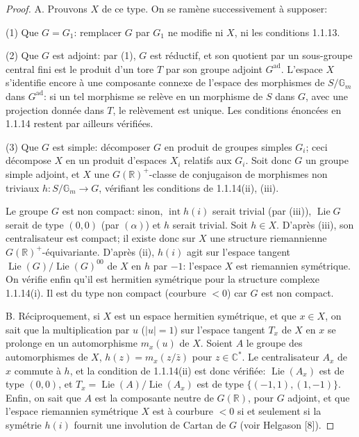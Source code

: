 \documentclass[12pt,a4paper]{article}
\theoremstyle{plain}
\theoremstyle{definition}
\theoremstyle{remark}
\DeclareMathOperator{\Lie}{Lie}
\DeclareMathOperator{\Int}{int}
\newcommand{\RR}{\mathbb{R}}
\newcommand{\CC}{\mathbb{C}}
\newcommand{\Gm}{\mathbb{G}}
\begin{document}
\begin{proof}
A. Prouvons $X$ de ce type. On se ram\`ene successivement \`a supposer:

(1) Que $G = G_1$: remplacer $G$ par $G_1$ ne modifie ni $X$, ni les conditions 1.1.13.

(2) Que $G$ est adjoint: par (1), $G$ est r\'eductif, et son quotient par un sous-groupe central fini est le produit d'un tore $T$ par son groupe adjoint $G^{\text{ad}}$. L'espace $X$ s'identifie encore \`a une composante connexe de l'espace des morphismes de $S/\Gm_m$ dans $G^{\text{ad}}$: si un tel morphisme se rel\`eve en un morphisme de $S$ dans $G$, avec une projection donn\'ee dans $T$, le rel\`evement est unique. Les conditions \'enonc\'ees en 1.1.14 restent par ailleurs v\'erifi\'ees.

(3) Que $G$ est simple: d\'ecomposer $G$ en produit de groupes simples $G_i$; ceci d\'ecompose $X$ en un produit d'espaces $X_i$ relatifs aux $G_i$. Soit donc $G$ un groupe simple adjoint, et $X$ une $G(\RR)^+$-classe de conjugaison de morphismes non triviaux $h:S/\Gm_m \to G$, v\'erifiant les conditions de 1.1.14(ii), (iii).

Le groupe $G$ est non compact: sinon, $\Int h(i)$ serait trivial (par (iii)), $\Lie G$ serait de type $(0,0)$ (par $(\alpha)$) et $h$ serait trivial. Soit $h \in X$. D'apr\`es (iii), son centralisateur est compact; il existe donc sur $X$ une structure riemannienne $G(\RR)^+$-\'equivariante. D'apr\`es (ii), $h(i)$ agit sur l'espace tangent $\Lie(G)/\Lie(G)^{00}$ de $X$ en $h$ par $-1$: l'espace $X$ est riemannien sym\'etrique. On v\'erifie enfin qu'il est hermitien sym\'etrique pour la structure complexe 1.1.14(i). Il est du type non compact (courbure $< 0$) car $G$ est non compact.

B. R\'eciproquement, si $X$ est un espace hermitien sym\'etrique, et que $x \in X$, on sait que la multiplication par $u$ ($|u|=1$) sur l'espace tangent $T_x$ de $X$ en $x$ se prolonge en un automorphisme $m_x(u)$ de $X$. Soient $A$ le groupe des automorphismes de $X$, $h(z) = m_x(z/\bar{z})$ pour $z \in \CC^*$. Le centralisateur $A_x$ de $x$ commute \`a $h$, et la condition de 1.1.14(ii) est donc v\'erifi\'ee: $\Lie(A_x)$ est de type $(0,0)$, et $T_x = \Lie(A)/\Lie(A_x)$ est de type $\{(-1,1),(1,-1)\}$. Enfin, on sait que $A$ est la composante neutre de $G(\RR)$, pour $G$ adjoint, et que l'espace riemannien sym\'etrique $X$ est \`a courbure $< 0$ si et seulement si la sym\'etrie $h(i)$ fournit une involution de Cartan de $G$ (voir Helgason [8]).
\end{proof}
\end{document}
